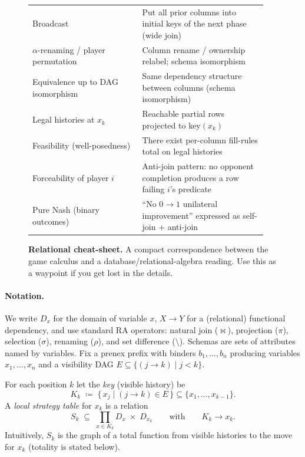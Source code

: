 \begin{figure}[t]
\begin{tabular}{p{0.44\linewidth} p{0.50\linewidth}}
    Broadcast & Put all prior columns into initial keys of the next phase (wide join) \\
    $\alpha$-renaming / player permutation & Column rename / ownership relabel; schema isomorphism \\
    Equivalence up to DAG isomorphism & Same dependency structure between columns (schema isomorphism) \\
    Legal histories at $x_k$ & Reachable partial rows projected to key$(x_k)$ \\
    Feasibility (well-posedness) & There exist per-column fill-rules total on legal histories \\
    Forceability of player $i$ & Anti-join pattern: no opponent completion produces a row failing $i$'s predicate \\
    Pure Nash (binary outcomes) & ``No $0\!\to\!1$ unilateral improvement'' expressed as self-join + anti-join \\
    \bottomrule
  \end{tabular}
  \caption{\textbf{Relational cheat-sheet.} A compact correspondence between the
  game calculus and a database/relational-algebra reading.  Use this as a
  waypoint if you get lost in the details.}
  \label{fig:ra-cheatsheet}
\end{figure}

\paragraph{Notation.}
We write $D_x$ for the domain of variable $x$, $X\to Y$ for a (relational)
functional dependency, and use standard RA operators: natural join ($\Join$),
projection ($\pi$), selection ($\sigma$), renaming ($\rho$), and set
difference ($\setminus$).  Schemas are sets of attributes named by variables.
Fix a prenex prefix with binders $b_1,\dots,b_n$ producing variables
$x_1,\dots,x_n$ and a visibility DAG $E\subseteq\{(j{\to}k)\mid j<k\}$.

\begin{definition}
For each position $k$ let the \emph{key} (visible history) be
\[
  K_k \;\coloneqq\; \{\,x_j \mid (j{\to}k)\in E\,\}\subseteq \{x_1,\dots,x_{k-1}\}.
\]
A \emph{local strategy table} for $x_k$ is a relation
\[
  S_k \;\subseteq\; \prod_{x\in K_k}\! D_x \;\times\; D_{x_k}
  \qquad\text{with}\qquad K_k \to x_k.
\]
Intuitively, $S_k$ is the graph of a total function from visible histories to
the move for $x_k$ (totality is stated below).
\end{definition}

